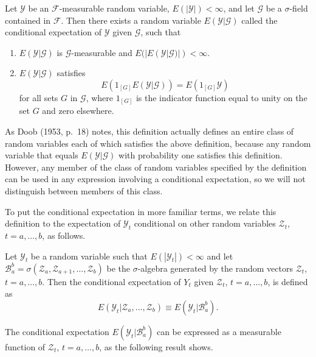 \begin{definition}\label{def:conditional-expectation}
Let $\mathcal{Y}$ be an $\mathcal{F}$-measurable random variable, $E(|\mathcal{Y}|) < \infty$, and let $\mathcal{G}$ be a $\sigma$-field contained in $\mathcal{F}$. Then there exists a random variable $E(\mathcal{Y}|\mathcal{G})$ called the conditional expectation of $\mathcal{Y}$ given $\mathcal{G}$, such that
\begin{enumerate}[label=(\roman*)]
\item $E(\mathcal{Y}|\mathcal{G})$ is $\mathcal{G}$-measurable and $E(|E(\mathcal{Y}|\mathcal{G})|) < \infty$.
\item $E(\mathcal{Y}|\mathcal{G})$ satisfies
\[
E(1_{[G]} E(\mathcal{Y}|\mathcal{G})) = E(1_{[G]} \mathcal{Y})
\]
for all sets $G$ in $\mathcal{G}$, where $1_{[G]}$ is the indicator function equal to unity on the set $G$ and zero elsewhere.
\end{enumerate}
\end{definition}

As Doob (1953, p.~18) notes, this definition actually defines an entire class of random variables each of which satisfies the above definition, because any random variable that equals $E(\mathcal{Y}|\mathcal{G})$ with probability one satisfies this definition. However, any member of the class of random variables specified by the definition can be used in any expression involving a conditional expectation, so we will not distinguish between members of this class.

To put the conditional expectation in more familiar terms, we relate this definition to the expectation of $\mathcal{Y}_t$ conditional on other random variables $\boldsymbol{\mathcal{Z}}_t$, $t = a, \ldots, b$, as follows.

\begin{definition}\label{def:conditional-expectation-rv}
Let $\mathcal{Y}_t$ be a random variable such that $E(|\mathcal{Y}_t|) < \infty$ and let $\mathcal{B}_a^b = \sigma(\boldsymbol{\mathcal{Z}}_a, \boldsymbol{\mathcal{Z}}_{a+1}, \ldots, \boldsymbol{\mathcal{Z}}_b)$ be the $\sigma$-algebra generated by the random vectors $\boldsymbol{\mathcal{Z}}_t$, $t = a, \ldots, b$. Then the conditional expectation of $Y_t$ given $\boldsymbol{\mathcal{Z}}_t$, $t = a, \ldots, b$, is defined as
\[
E(\mathcal{Y}_t | \boldsymbol{\mathcal{Z}}_a, \ldots, \boldsymbol{\mathcal{Z}}_b) \equiv E(\mathcal{Y}_t | \mathcal{B}_a^b).
\]
\end{definition}

The conditional expectation $E(\mathcal{Y}_t | \mathcal{B}_a^b)$ can be expressed as a measurable function of $\boldsymbol{\mathcal{Z}}_t$, $t = a, \ldots, b$, as the following result shows.

